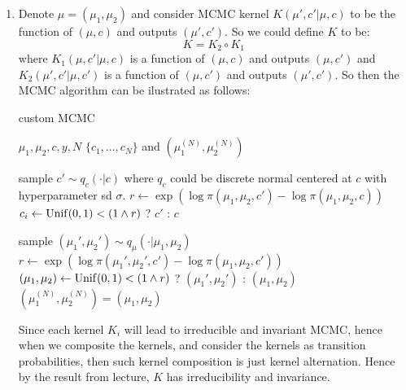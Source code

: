\documentclass{article}
\begin{document}



\begin{enumerate}
\item 
Denote $\mu = (\mu_1, \mu_2)$ and consider MCMC kernel $K(\mu', c' | \mu, c)$ to be the function of $(\mu, c)$ and outputs $(\mu', c')$. So we could define $K$  to be:
\[K = K_2 \circ K_1\]where $K_1(\mu, c' |\mu, c)$ is a function of $(\mu, c)$ and outputs $(\mu, c')$ and $K_2(\mu', c' | \mu, c')$ is a function of $(\mu, c')$ and outputs $(\mu', c')$. So then the MCMC algorithm can be ilustrated as follows:
\begin{algorithm}
    \caption{custom MCMC}
    \label{algo:mixture}
    \begin{algorithmic}[1]
        \Require $\mu_1, \mu_2, c, y, N$
        \Ensure $\{c_1, \ldots, c_N\}$ and $(\mu_1^{(N)}, \mu_2^{(N)})$

        \State sample $c' \sim q_c( \cdot | c)$ where $q_c$ could be discrete normal centered at $c$ with hyperparameter sd $\sigma$.
        \State $r \leftarrow \exp(\log\pi(\mu_1, \mu_2, c') - \log\pi(\mu_1, \mu_2, c))$
        \State $c_i \leftarrow \operatorname{Unif}(0,1) < (1 \wedge r)$ ? $c'$ : $c$

        \State sample $(\mu_1', \mu_2') \sim q_{\mu}(\cdot | \mu_1, \mu_2)$
        \State $r \leftarrow \exp(\log\pi(\mu_1', \mu_2', c') - \log\pi(\mu_1, \mu_2, c'))$
        \State $(\mu_1, \mu_2) \leftarrow \operatorname{Unif}(0,1) < (1 \wedge r)$ ? $(\mu_1', \mu_2')$ : $(\mu_1, \mu_2)$
        \EndFor
        \State $(\mu_1^{(N)}, \mu_2^{(N)}) = (\mu_1, \mu_2)$
    \end{algorithmic}
\end{algorithm}

Since each kernel $K_i$ will lead to irreducible and invariant MCMC, hence when we composite the kernels, and consider the kernels as transition probabilities, then such kernel composition is just kernel alternation. Hence by the result from lecture, $K$ has irreducibility and invariance.




\end{enumerate}
\end{document}
